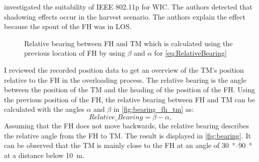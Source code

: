 \textcite{klingler_agriculture_2018} investigated the suitability of IEEE 802.11p for \ac{WIC}.
The authors detected that shadowing effects occur in the harvest scenario.
The authors explain the effect because the spout of the \ac{FH} was in \ac{LOS}.
\begin{figure}%
   \centering
   \caption{Relative bearing between \acf{FH} and \acf{TM} which is calculated using the previous location of \ac{FH} by using $\beta$ and $\alpha$ for \autoref{eq:RelativeBearing}}%
   \label{fig:bearing_fh_tm}%
\end{figure}
I reviewed the recorded position data to get an overview of the \ac{TM}'s position relative to the \ac{FH} in the overloading process. The relative bearing is the angle between the position of the \ac{TM} and the heading of the position of the \ac{FH}. Using the previous position of the \ac{FH}, the relative bearing between \ac{FH} and \ac{TM} can be calculated with the angles $\alpha$ and $\beta$ in \autoref{fig:bearing_fh_tm} as:
\begin{equation}\label{eq:RelativeBearing}
   Relative\_Bearing = \beta - \alpha ,
\end{equation}
Assuming that the \ac{FH} does not move backwards, the relative bearing describes the relative angle from the
\ac{FH} to \ac{TM}.
The result is displayed in \autoref{fig:bearing}.
It can be observed that the \ac{TM} is mainly close to the \ac{FH} at an angle of \SIrange{30}{90}{\degree} at
a distance below \SI{10}{\metre}.

